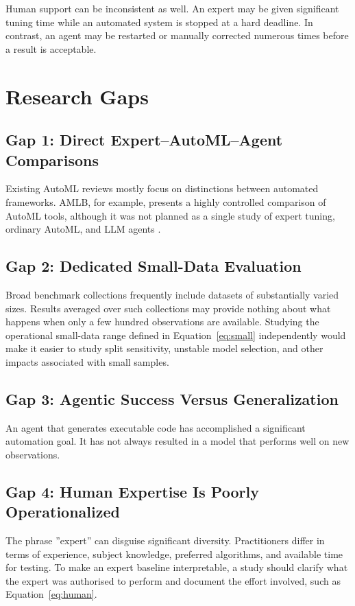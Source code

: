 \documentclass[acmsmall,screen]{acmart}
\begin{document}
Human support can be inconsistent as well. An expert may be given significant tuning time while an automated system is stopped at a hard deadline. In contrast, an agent may be restarted or manually corrected numerous times before a result is acceptable.

\section{Research Gaps}\label{sec:gaps}

\subsection{Gap 1: Direct Expert--AutoML--Agent Comparisons}

Existing AutoML reviews mostly focus on distinctions between automated frameworks. AMLB, for example, presents a highly controlled comparison of AutoML tools, although it was not planned as a single study of expert tuning, ordinary AutoML, and LLM agents \cite{gijsbers2024}.

\subsection{Gap 2: Dedicated Small-Data Evaluation}

Broad benchmark collections frequently include datasets of substantially varied sizes. Results averaged over such collections may provide nothing about what happens when only a few hundred observations are available. Studying the operational small-data range defined in Equation~\ref{eq:small} independently would make it easier to study split sensitivity, unstable model selection, and other impacts associated with small samples.

\subsection{Gap 3: Agentic Success Versus Generalization}

An agent that generates executable code has accomplished a significant automation goal. It has not always resulted in a model that performs well on new observations.

\subsection{Gap 4: Human Expertise Is Poorly Operationalized}

The phrase ''expert'' can disguise significant diversity. Practitioners differ in terms of experience, subject knowledge, preferred algorithms, and available time for testing. To make an expert baseline interpretable, a study should clarify what the expert was authorised to perform and document the effort involved, such as Equation~\ref{eq:human}.
\end{document}
